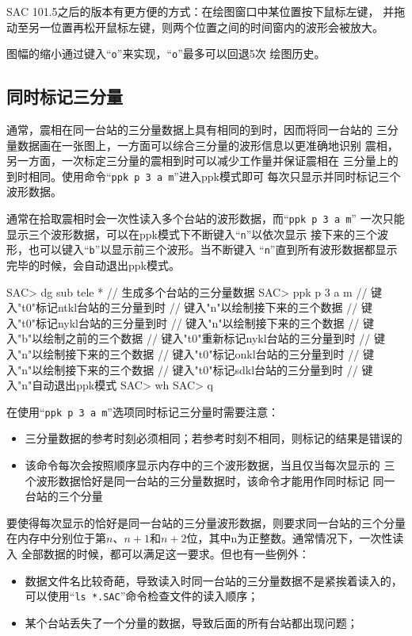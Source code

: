 SAC 101.5之后的版本有更方便的方式：在绘图窗口中某位置按下鼠标左键，
并拖动至另一位置再松开鼠标左键，则两个位置之间的时间窗内的波形会被放大。

图幅的缩小通过键入``\texttt{o}''来实现，``\texttt{o}''最多可以回退5次
绘图历史。

\subsection{同时标记三分量}
通常，震相在同一台站的三分量数据上具有相同的到时，因而将同一台站的
三分量数据画在一张图上，一方面可以综合三分量的波形信息以更准确地识别
震相，另一方面，一次标定三分量的震相到时可以减少工作量并保证震相在
三分量上的到时相同。使用命令``\texttt{ppk p 3 a m}''进入ppk模式即可
每次只显示并同时标记三个波形数据。

通常在拾取震相时会一次性读入多个台站的波形数据，而``\texttt{ppk p 3 a m}''
一次只能显示三个波形数据，可以在ppk模式下不断键入``\texttt{n}''以依次显示
接下来的三个波形，也可以键入``\texttt{b}''以显示前三个波形。当不断键入
``\texttt{n}''直到所有波形数据都显示完毕的时候，会自动退出ppk模式。

\begin{SACCode}
SAC> dg sub tele *       // 生成多个台站的三分量数据
SAC> ppk p 3 a m
// 键入"t0"标记ntkl台站的三分量到时
// 键入"n"以绘制接下来的三个数据
// 键入"t0"标记nykl台站的三分量到时
// 键入"n"以绘制接下来的三个数据
// 键入"b"以绘制之前的三个数据
// 键入"t0"重新标记nykl台站的三分量到时
// 键入"n"以绘制接下来的三个数据
// 键入"t0"标记onkl台站的三分量到时
// 键入"n"以绘制接下来的三个数据
// 键入"t0"标记sdkl台站的三分量到时
// 键入"n"自动退出ppk模式
SAC> wh
SAC> q
\end{SACCode}

在使用``\texttt{ppk p 3 a m}''选项同时标记三分量时需要注意：
\begin{itemize}
\item 三分量数据的参考时刻必须相同；若参考时刻不相同，则标记的结果是错误的
\item 该命令每次会按照顺序显示内存中的三个波形数据，当且仅当每次显示的
    三个波形数据恰好是同一台站的三分量数据时，该命令才能用作同时标记
    同一台站的三个分量
\end{itemize}

要使得每次显示的恰好是同一台站的三分量波形数据，则要求同一台站的三个分量
在内存中分别位于第$n$、$n+1$和$n+2$位，其中n为正整数。通常情况下，一次性读入
全部数据的时候，都可以满足这一要求。但也有一些例外：
\begin{itemize}
\item 数据文件名比较奇葩，导致读入时同一台站的三分量数据不是紧挨着读入的，
    可以使用``\texttt{ls *.SAC}''命令检查文件的读入顺序；
\item 某个台站丢失了一个分量的数据，导致后面的所有台站都出现问题；
\end{itemize}

